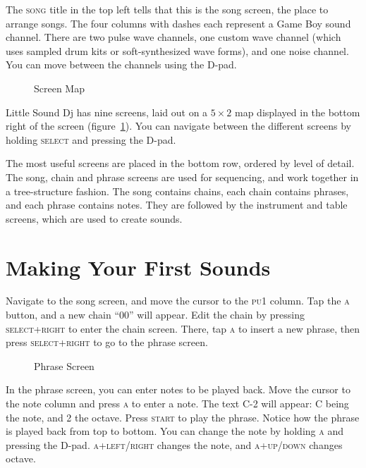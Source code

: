 The \textsc{song} title in the top left tells that this is the song screen,
the place to arrange songs. The four columns with dashes each represent a
Game Boy sound channel. There are two pulse wave channels, one custom wave channel
(which uses sampled drum kits or soft-synthesized wave forms), and one noise channel. You
can move between the channels using the D-pad.

\begin{figure}[hbtp]
\centering
{}
\caption{Screen Map}
\label{fig:map}
\end{figure}

Little Sound Dj has nine screens, laid out on a \begin{math} 5 \times 2 \end{math} map displayed in the
bottom right of the screen (figure~\ref{fig:map}). You can navigate between the different screens by
holding \textsc{select} and pressing the D-pad.

The most useful screens are placed in the bottom row, ordered by level of detail. 
The song, chain and phrase screens are used for sequencing, and work together in a tree-structure
fashion.  The song contains chains, each chain contains phrases, and each phrase contains notes.
They are followed by the instrument and table screens, which are used to create sounds.

\section{Making Your First Sounds}
Navigate to the song screen, and move the cursor to the \textsc{pu1} column. Tap the \textsc{a} button,
and a new chain ``00'' will appear.
Edit the chain by pressing \textsc{select+right} to enter the chain screen.
There, tap \textsc{a} to insert a new phrase, then press \textsc{select+right} to go to the phrase screen.

\begin{figure}[hbtp]
\centering
{}
\caption{Phrase Screen}
\label{fig:phrase1}
\end{figure}

In the phrase screen, you can enter notes to be played back. Move the cursor to the note
column and press \textsc{a} to enter a note. The text C-2 will appear: C being the note, and 2 the
octave. Press \textsc{start} to play the phrase. Notice how the phrase is played back from
top to bottom. You can change the note by holding \textsc{a} and pressing the
D-pad. \textsc{a+left/right} changes the note, and \textsc{a+up/down} changes octave.

